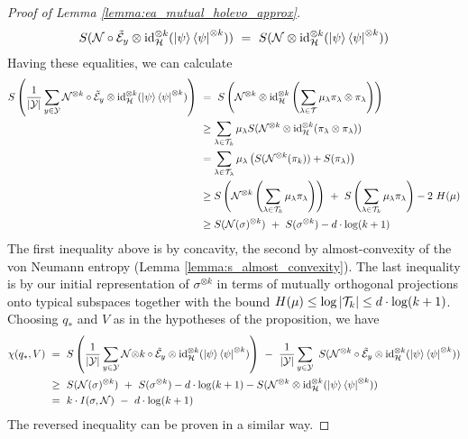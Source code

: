 \begin{proof}[Proof of Lemma \ref{lemma:ea_mutual_holevo_approx}]
\begin{align}
S({\mathcal N} \circ \tilde{{\mathcal E}}_y \otimes \mathrm{id}_{{\mathcal H}}^{\otimes k}(\ket{\psi}\bra{\psi}^{\otimes k})) \
= \ S({\mathcal N} \otimes \mathrm{id}_{{\mathcal H}}^{\otimes k}(\ket{\psi}\bra{\psi}^{\otimes k}))
\end{align}
Having these equalities, we can calculate
\begin{align*}
S\left(\frac{1}{|\cY|} \sum_{y \in \cY} \cN^{\otimes k} \circ \tilde{\cE}_y \otimes \id_{\cH}^{\otimes k} (\ket{\psi}\bra{\psi}^{\otimes k})\right) \ 
& = \ S\left(\cN^{\otimes k} \otimes \id_{\cH}^{\otimes k}\left(\sum_{\lambda \in \cT} \mu_\lambda \pi_\lambda \otimes \pi_\lambda\right)\right) \\
& \geq  \sum_{\lambda \in \cT_k} \mu_\lambda S(\cN^{\otimes k} \otimes \id_{\cH}^{\otimes k}(\pi_\lambda \otimes \pi_\lambda)) \\
& = \sum_{\lambda \in \cT_\lambda} \mu_\lambda \left( S(\cN^{\otimes k}(\pi_k)) + S(\pi_\lambda)\right)\\
& \geq S\left(\cN^{\otimes k}\left(\sum_{\lambda \in \cT_k} \mu _\lambda \pi_\lambda\right)\right) 
 \ + \ S\left(\sum_{\lambda \in \cT_k} \mu _\lambda \pi_\lambda\right)  
 - 2\ H(\mu) \\ 
& \geq S(\cN(\sigma)^{\otimes k}) \ + \ S(\sigma^{\otimes k}) - d \cdot \log(k+1)
\end{align*}
The first inequality above is by concavity, the second by almost-convexity of the von Neumann entropy (Lemma \ref{lemma:s_almost_convexity}). The last inequality is by our initial representation of $\sigma^{\otimes k}$ in terms of mutually orthogonal projections onto typical subspaces together with the bound $H(\mu) \leq \log |{\mathcal T}_k| \leq d \cdot \log(k+1)$. \newline 
Choosing $q_\ast$ and $V$ as in the hypotheses of the proposition, we have
\begin{align*}
  \chi(q_\ast, V) \ 
  & = \ S\left(\frac{1}{|\cY|} \sum_{y \in \cY} \cN{\otimes k} \circ \tilde{\cE}_y \otimes \id_{\cH}^{\otimes k} (\ket{\psi}\bra{\psi}^{\otimes k})\right) 
  \ - \ \frac{1}{|\cY|} \sum_{y \in \cY} \ S(\cN^{\otimes k} \circ \tilde{\cE}_y \otimes \id_{\cH}^{\otimes k}(\ket{\psi}\bra{\psi}^{\otimes k})) \\
  & \geq \ S(\cN(\sigma)^{\otimes k}) \ + \ S(\sigma^{\otimes k}) - d \cdot \log(k+1)
    - S(\cN^{\otimes k} \otimes \id_{\cH}^{\otimes k}(\ket{\psi}\bra{\psi}^{\otimes k})) \\
  & = \ k \cdot I(\sigma, \cN) \ - \ d \cdot \log(k+1)
\end{align*}
The reversed inequality can be proven in a similar way.
\end{proof}
